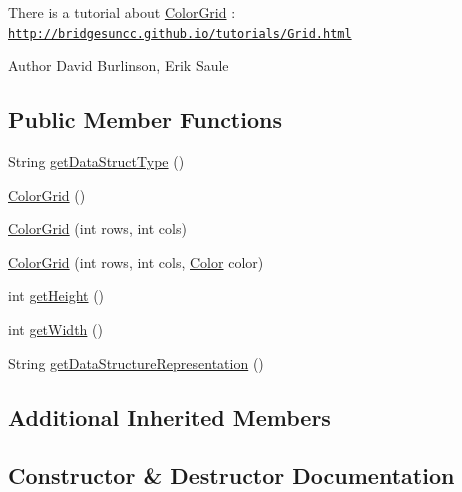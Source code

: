 There is a tutorial about \hyperlink{classbridges_1_1base_1_1_color_grid}{Color\+Grid} \+: \href{http://bridgesuncc.github.io/tutorials/Grid.html}{\tt http\+://bridgesuncc.\+github.\+io/tutorials/\+Grid.\+html}

\begin{DoxyAuthor}{Author}
David Burlinson, Erik Saule 
\end{DoxyAuthor}
\subsection*{Public Member Functions}
\begin{DoxyCompactItemize}
\item 
String \hyperlink{classbridges_1_1base_1_1_color_grid_a53a1f3f105f8545796f98e5fac559b5b}{get\+Data\+Struct\+Type} ()
\item 
\hyperlink{classbridges_1_1base_1_1_color_grid_af434a5a3dcbaf86e51ac6f9e1c1d7e5f}{Color\+Grid} ()
\item 
\hyperlink{classbridges_1_1base_1_1_color_grid_aafb4157a4c8129f30c1f989fcdfda544}{Color\+Grid} (int rows, int cols)
\item 
\hyperlink{classbridges_1_1base_1_1_color_grid_aef40242c93b66ab851e6afa64cada0b5}{Color\+Grid} (int rows, int cols, \hyperlink{classbridges_1_1base_1_1_color}{Color} color)
\item 
int \hyperlink{classbridges_1_1base_1_1_color_grid_a8793791e35f03b3e5a2e5ef3606ac124}{get\+Height} ()
\item 
int \hyperlink{classbridges_1_1base_1_1_color_grid_af872226de86ac8e8f2553fdc5bddc375}{get\+Width} ()
\item 
String \hyperlink{classbridges_1_1base_1_1_color_grid_a81ca0995d17b6cb31122b718dfa57286}{get\+Data\+Structure\+Representation} ()
\end{DoxyCompactItemize}
\subsection*{Additional Inherited Members}


\subsection{Constructor \& Destructor Documentation}
\mbox{\label{classbridges_1_1base_1_1_color_grid_af434a5a3dcbaf86e51ac6f9e1c1d7e5f}} 
